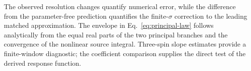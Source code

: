 The observed resolution changes quantify numerical error, while the
difference from the parameter-free prediction quantifies the finite-$\sigma$
correction to the leading matched approximation.
The envelope in Eq.~\eqref{eq:principal-law} follows analytically from
the equal real parts of the two principal branches and the convergence of
the nonlinear source integral.  Three-spin slope estimates provide a
finite-window diagnostic; the coefficient comparison supplies the direct
test of the derived response function.
